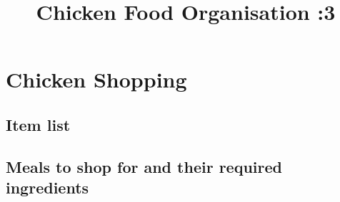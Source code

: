 \documentclass[a4paper,12pt]{article}
\title{Chicken Food Organisation :3}
\numberwithin{equation}{section} %
\begin{document}
\maketitle

\section{Chicken Shopping}
\subsection{Item list}


\subsection{Meals to shop for and their required ingredients}
\end{document}
